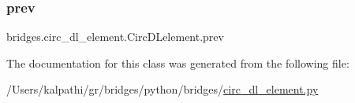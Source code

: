 \subsubsection{\texorpdfstring{prev}{prev}}
{\footnotesize\ttfamily bridges.\+circ\+\_\+dl\+\_\+element.\+Circ\+D\+Lelement.\+prev}



The documentation for this class was generated from the following file\+:\begin{DoxyCompactItemize}
\item 
/\+Users/kalpathi/gr/bridges/python/bridges/\mbox{\hyperlink{circ__dl__element_8py}{circ\+\_\+dl\+\_\+element.\+py}}\end{DoxyCompactItemize}
